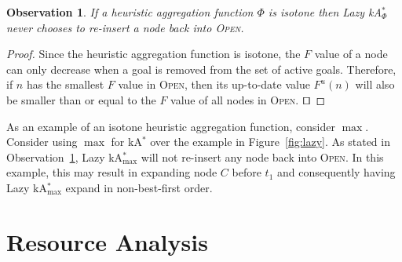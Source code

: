 \documentclass[smallextended]{svjour3}       %
\newtheorem{observation}[theorem]{Observation}
\newcommand{\kastar}{kA$^*$\xspace}
\newcommand{\kastarvar}[1]{\textup{kA}$^*_{#1}$\xspace}
\newcommand{\kastarmax}{\kastarvar{\max}}
\newcommand{\kastarphi}{\textup{kA}$^*_{\Phi}$\xspace}
\newcommand{\open}{\textsc{Open}\xspace}
\newcommand{\future}[1]{ }
\newcommand{\roni}[1]{\textbf{[RS:#1]}}
\begin{document}


\begin{observation}
  \label{obs:genMaxNoLazy}
  If a heuristic aggregation function $\Phi$ is isotone then 
  Lazy \kastarphi never chooses to re-insert a node back into \open.
\end{observation}
\begin{proof}
Since the heuristic aggregation function is isotone, the $F$ value of a node can only decrease when a goal is removed from the set of active goals. 
Therefore, if $n$ has the smallest $F$ value in \open, 
then its up-to-date value $F^u(n)$ will also be smaller than or equal to the $F$ value of all nodes in \open. $\qed$
\end{proof}
As an example of an isotone heuristic aggregation function, consider $\max$. 
Consider using $\max$ for \kastar over the example in Figure~\ref{fig:lazy}. 
As stated in Observation~\ref{obs:genMaxNoLazy}, Lazy \kastarmax will not re-insert any node back into \open. In this example, this may result in expanding node $C$ before $t_1$ and consequently having Lazy \kastarmax expand in non-best-first order. 




\future{TODO: Modify the Theorem \ref{the:lazyGood} to have the dual---if $\Phi$ is not antitone then there exists a case where it is not best-first search}





\section{Resource Analysis}
\label{sec:resource-analysis}
\end{document}
